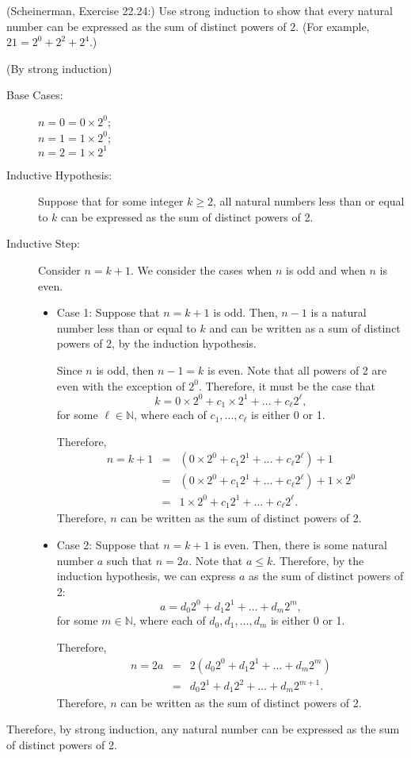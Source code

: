 \documentclass{article}
\theoremstyle{definition}
\begin{document}
\begin{question}
    (Scheinerman, Exercise 22.24:)
    Use strong induction to show that every natural number can be expressed as the sum of distinct powers of $2$.  (For example, $21 = 2^0 + 2^2 + 2^ 4$.)
\end{question}
\begin{solution}(By strong induction)
	\begin{description}
	\item[Base Cases: ] $n = 0 = 0 \times 2^0$;\\$n = 1 = 1 \times 2^0$;\\$n=2 = 1 \times 2^1$
	\item[Inductive Hypothesis: ] Suppose that for some integer $k \geq 2$, all natural numbers less than or equal to $k$ can be expressed as the sum of distinct powers of 2.
	\item[Inductive Step: ] Consider $n = k+1$.  We consider the cases when $n$ is odd and when $n$ is even.
	\begin{itemize}
	\item Case 1: Suppose that $n = k+1$ is odd.  Then, $n-1$ is a natural number less than or equal to $k$ and can be written as a sum of distinct powers of 2, by the induction hypothesis.

	Since $n$ is odd, then $n-1 = k$ is even.  Note that all powers of 2 are even with the exception of $2^0$.  Therefore, it must be the case that \[k = 0 \times 2^0 + c_1 \times 2^1 + \ldots + c_\ell 2^\ell,\] for some $\ell \in \mathbb{N}$, where each of $c_1, \ldots, c_\ell$ is either 0 or 1.

	Therefore,
	\begin{eqnarray*}
	n = k + 1 & = & (0 \times 2^0 + c_1 2^1 + \ldots + c_\ell 2^\ell) + 1 \\
		& = & (0 \times 2^0 + c_1 2^1 + \ldots + c_\ell 2^\ell) + 1 \times 2^0 \\
		& = & 1 \times 2^0 + c_1 2^1 + \ldots + c_\ell 2^\ell.
	\end{eqnarray*}
	Therefore, $n$ can be written as the sum of distinct powers of 2.

	\item Case 2: Suppose that $n = k+1$ is even.  Then, there is some natural number $a$ such that $n = 2a$.  Note that $a \leq k$.  Therefore, by the induction hypothesis, we can express $a$ as the sum of distinct powers of 2:
	\[ a = d_0 2^0 + d_1 2^1 + \ldots + d_m 2^m, \]
	for some $m \in \mathbb{N}$, where each of $d_0, d_1, \ldots, d_m$ is either 0 or 1.

	Therefore,
	\begin{eqnarray*}
	n = 2a & = & 2 (d_0 2^0 + d_1 2^1 + \ldots + d_m 2^m) \\
		& = & d_0 2^1 + d_1 2^2 + \ldots + d_m 2^{m+1}.
	\end{eqnarray*}
	Therefore, $n$ can be written as the sum of distinct powers of 2.
	\end{itemize}
	\end{description}
	Therefore, by strong induction, any natural number can be expressed as the sum of distinct powers of 2.
\end{solution}
\end{document}
